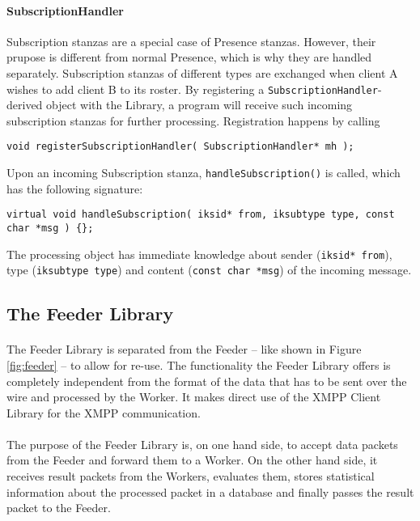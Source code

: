 \paragraph{SubscriptionHandler}
Subscription stanzas are a special case of Presence stanzas. However, their prupose is different from normal Presence, which is why they are handled separately. Subscription stanzas of different types are exchanged when client A wishes to add client B to its roster. By registering a \texttt{SubscriptionHandler}-derived object with the Library, a program will receive such incoming subscription stanzas for further processing. Registration happens by calling
\begin{flushleft}
\texttt{void registerSubscriptionHandler( SubscriptionHandler* mh );}
\end{flushleft}
Upon an incoming Subscription stanza, \texttt{handleSubscription()} is called, which has the following signature:
\begin{flushleft}
\texttt{virtual void handleSubscription( iksid* from, iksubtype type, const char *msg ) \{\};}
\end{flushleft}
The processing object has immediate knowledge about sender (\texttt{iksid* from}), type (\texttt{iksubtype type}) and content (\texttt{const char *msg}) of the incoming message.


\subsection{The Feeder Library}
\paragraph{}
The Feeder Library is separated from the Feeder -- like shown in Figure \ref{fig:feeder} -- to allow for re-use. The functionality the Feeder Library offers is completely independent from the format of the data that has to be sent over the wire and processed by the Worker. It makes direct use of the XMPP Client Library for the XMPP communication.

\paragraph{}
The purpose of the Feeder Library is, on one hand side, to accept data packets from the Feeder and forward them to a Worker. On the other hand side, it receives result packets from the Workers, evaluates them, stores statistical information about the processed packet in a database and finally passes the result packet to the Feeder.

